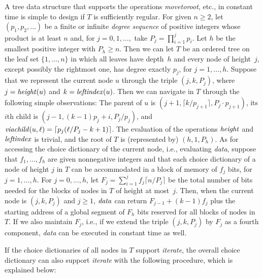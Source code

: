 \documentclass[envcountsame,envcountsect,undated,nolinenumbers]{lnthi}
\def\Tvn#1{\hbox{\textit{#1\/}}}
\def\Tceil#1{\lceil #1\rceil}
\begin{document}
A tree data structure that supports the operations
\Tvn{movetoroot}, etc., in constant time is simple
to design if $T$ is sufficiently regular.
For given $n\ge 2$, let $(p_1,p_2,\ldots)$ be
a finite or
infinite
\emph{degree sequence}
of positive integers whose product
is at least $n$
and, for $j=0,1,\ldots,$
take $P_j=\prod_{i=1}^j p_i$.
Let $h$ be the smallest positive
integer with $P_h\ge n$.
Then we can let $T$ be an ordered tree on the leaf
set $\{1,\ldots,n\}$ in which all leaves have
depth~$h$ and every node of height~$j$, except
possibly the rightmost one, has degree exactly $p_j$,
for $j=1,\ldots,h$.
Suppose that we represent the current node $u$
through the triple $(j,k,P_j)$, where
$j=\Tvn{height}(u)$ and $k=\Tvn{leftindex}(u)$.
Then we can navigate in $T$ through the following
simple observations:
The parent of $u$ is
$(j+1,\Tceil{{k/{p_{j+1}}}},P_j\cdot p_{j+1})$,
its $i$th child is
$(j-1,(k-1)p_j+i,{{P_j}/{p_j}})$,
and $\Tvn{viachild}(u,\ell)=
 \Tceil{p_j({\ell/{P_j}}-k+1)}$.
The evaluation of the operations
$\Tvn{height}$ and $\Tvn{leftindex}$ is trivial,
and the root of $T$ is (represented by) $(h,1,P_h)$.
As for accessing the choice dictionary
of the current node, i.e., evaluating \Tvn{data},
suppose that $f_1,\ldots,f_h$ are given nonnegative
integers and that each choice dictionary of a
node of height $j$ in $T$ can be accommodated in
a block of memory of $f_j$ bits, for $j=1,\ldots,h$.
For $j=0,\ldots,h$, let
$F_j=\sum_{i=1}^j f_j\Tceil{{n/{P_j}}}$ be
the total number of bits needed for the
blocks of nodes in $T$ of height at most~$j$.
Then, when the current node is $(j,k,P_j)$ and $j\ge 1$,
$\Tvn{data}$ can return $F_{j-1}+(k-1)f_j$
plus the starting address of a global segment of
$F_h$ bits reserved for all blocks of nodes in~$T$.
If we also maintain $F_j$, i.e., if we extend the
triple $(j,k,P_j)$ by $F_j$ as a fourth component,
\Tvn{data} can be executed in constant time as well.

If the choice dictionaries of all nodes in $T$
support \Tvn{iterate}, the overall choice
dictionary can also support \Tvn{iterate}
with the following procedure, which is explained
below:
\end{document}
